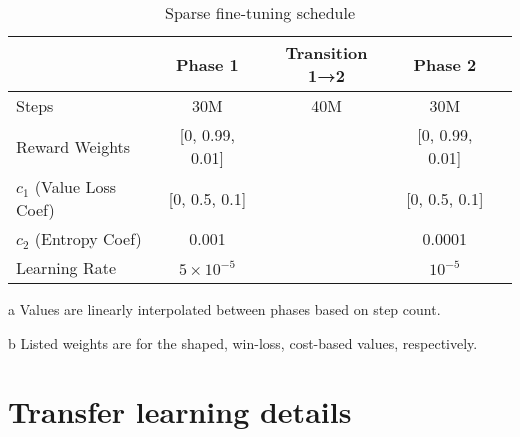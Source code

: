 \documentclass[conference]{IEEEtran}
\newcounter{supptable}
\newenvironment{supptable}
  {\renewcommand{\tablename}{Supplemental Table}\setcounter{table}{\value{supptable}}\addtocounter{supptable}{1}\begin{table}}
  {\end{table}\setcounter{supptable}{\value{table}}}
\begin{document}
\begin{supptable}[H]
    \centering
    \begin{threeparttable}
    \caption{Sparse fine-tuning schedule}
    \label{tab:sparse-finetuning-schedule}
    \begin{tabular}{lcccc}
    \toprule
     & Phase 1 & Transition 1→2\tnote{a} & Phase 2 \\
     \midrule
    Steps & 30M & 40M & 30M \\
    Reward Weights\tnote{b} & [0, 0.99, 0.01] &  & [0, 0.99, 0.01] \\
    $c_1$ (Value Loss Coef)\tnote{b} & [0, 0.5, 0.1] &  & [0, 0.5, 0.1]\\
    $c_2$ (Entropy Coef) & 0.001 & & 0.0001 \\
    Learning Rate & $5 \times 10^{-5}$ & & $10^{-5}$ \\
    \bottomrule
    \end{tabular}
    \begin{tablenotes}
       \item[a] Values are linearly interpolated between phases based on step count.
       \item[b] Listed weights are for the shaped, win-loss, cost-based values, respectively.
    \end{tablenotes}
    \end{threeparttable}
\end{supptable}

\section{Transfer learning details}
\label{appendix:transfer-learning-details}
\end{document}
